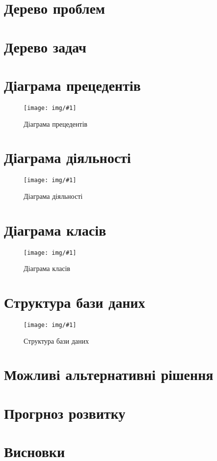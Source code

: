 \documentclass[14pt,a4paper,oneside]{extbook}
\newcommand{\DefaultFigure}[3]{
	\begin{figure}[H]
		\centering
		\texttt{[image: img/\#1]}
		\caption{#2}
		\label{pic:#3}
	\end{figure}
}
\begin{document}
\chapter{Дерево проблем}
\chapter{Дерево задач}
\chapter{Діаграма прецедентів}
	\DefaultFigure{UseCaseDiagram.png}{Діаграма прецедентів}{UCDiag}
\chapter{Діаграма діяльності}
	\DefaultFigure{ActivityDiagram.png}{Діаграма діяльності}{ActivityDiag}
\chapter{Діаграма класів}
	\DefaultFigure{ClassDiagram.drawio.png}{Діаграма класів}{ClassDiag}
\chapter{Структура бази даних}
	\DefaultFigure{ER.drawio.png}{Структура бази даних}{ERDiag}	
\chapter{Можливі альтернативні рішення}

\chapter{Прогрноз розвитку}

\chapter{Висновки}
\end{document}
